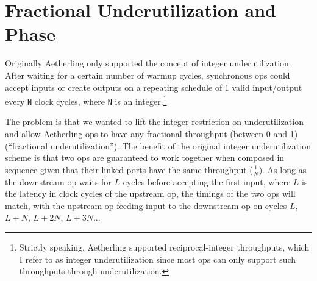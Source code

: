 \documentclass[12pt]{article}
\begin{document}
\section{Fractional Underutilization and Phase}


Originally Aetherling only supported the concept of integer
underutilization. After waiting for a certain number of warmup cycles,
synchronous ops could accept inputs or create outputs on a repeating
schedule of 1 valid input/output every \texttt{N} clock cycles, where
\texttt{N} is an integer.\footnote{Strictly speaking, Aetherling
  supported reciprocal-integer throughputs, which I refer to as
  integer underutilization since most ops can only support such
  throughputs through underutilization.}

The problem is that we wanted to lift the integer restriction on
underutilization and allow Aetherling ops to have any fractional
throughput (between 0 and 1) (``fractional underutilization''). The
benefit of the original integer underutilization scheme is that two
ops are guaranteed to work together when composed in sequence given
that their linked ports have the same throughput ($\frac{1}{N}$). As
long as the downstream op waits for $L$ cycles before accepting the
first input, where $L$ is the latency in clock cycles of the upstream
op, the timings of the two ops will match, with the upstream op
feeding input to the downstream op on cycles $L$, $L+N$, $L+2N$,
$L+3N$...
\end{document}
